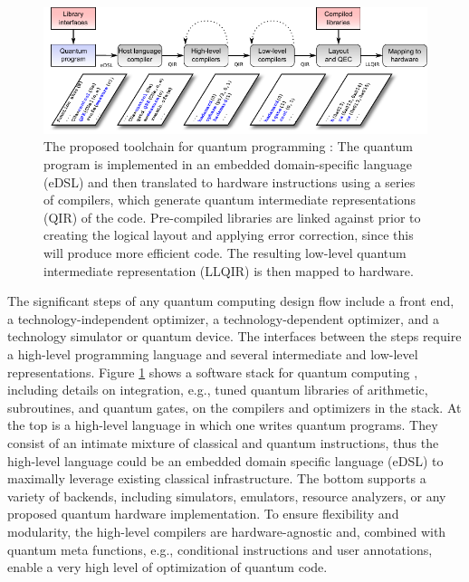 \documentclass[journal]{IEEEtran}
\begin{document}
\begin{figure}[t]
\centering
\includegraphics[width=\textwidth]{figures/coarse_toolchain}
\caption{The proposed toolchain for quantum programming \cite{stack}: The quantum program is implemented in an embedded domain-specific language (eDSL) and then translated to hardware instructions using a series of compilers, which generate quantum intermediate representations (QIR) of the code. Pre-compiled libraries are linked against prior to creating the logical layout and applying error correction, since this will produce more efficient code. The resulting low-level quantum intermediate representation (LLQIR) is then mapped to hardware.}
\label{fig:toolchain}
\end{figure}


The significant steps of any quantum computing design flow \cite{svore2006layered} include a front end, a technology-independent optimizer, a technology-dependent optimizer, and a technology simulator or quantum device.  The interfaces between the steps require a high-level programming language and several intermediate and low-level representations.
Figure \ref{fig:toolchain} shows a software stack for quantum computing \cite{stack}, including details on integration, e.g., tuned quantum libraries of arithmetic, subroutines, and quantum gates, on the compilers and optimizers in the stack.
At the top is a high-level language in which one writes quantum programs.
They consist of an intimate mixture of classical and quantum instructions, thus the high-level language could be an embedded domain specific language (eDSL) to maximally leverage existing classical infrastructure.
The bottom supports a variety of backends, including simulators, emulators, resource analyzers, or any proposed quantum hardware implementation.
To ensure flexibility and modularity, the high-level compilers are hardware-agnostic and, combined with quantum meta functions, e.g., conditional instructions and user annotations, enable a very high level of optimization of quantum code.

\end{document}
